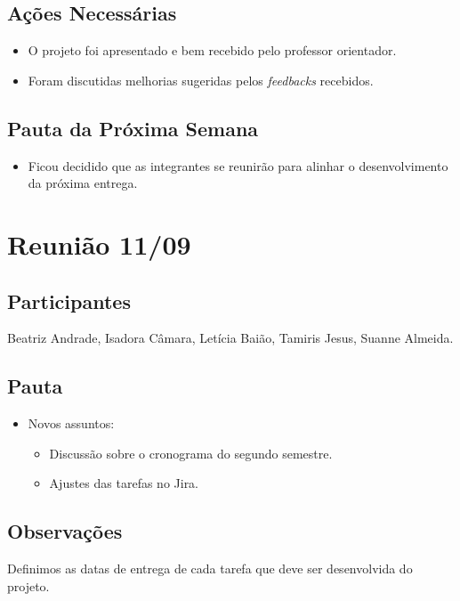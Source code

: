 \begin{apendicesenv}
\subsection*{Ações Necessárias}
\begin{itemize}
    \item O projeto foi apresentado e bem recebido pelo professor orientador.
    \item Foram discutidas melhorias sugeridas pelos \textit{feedbacks} recebidos.
\end{itemize}

\subsection*{Pauta da Próxima Semana}
\begin{itemize}
    \item Ficou decidido que as integrantes se reunirão para alinhar o desenvolvimento da próxima entrega.
\end{itemize}

\section*{Reunião 11/09}

\subsection*{Participantes}
Beatriz Andrade, Isadora Câmara, Letícia Baião, Tamiris Jesus, Suanne Almeida.

\subsection*{Pauta}
\begin{itemize}
    \item Novos assuntos:
    \begin{itemize}
        \item Discussão sobre o cronograma do segundo semestre.
        \item Ajustes das tarefas no Jira.
    \end{itemize}
\end{itemize}

\subsection*{Observações}
 Definimos as datas de entrega de cada tarefa que deve ser desenvolvida do projeto.


\end{apendicesenv}
